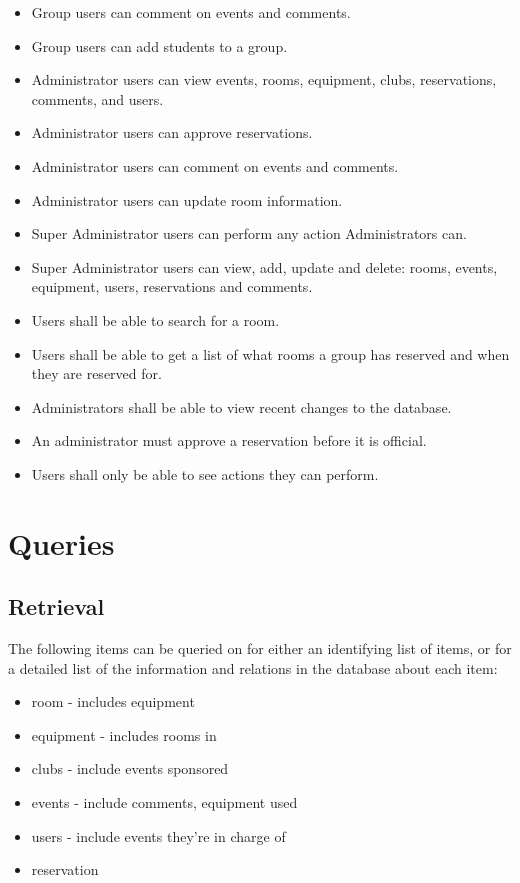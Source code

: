 \documentclass{article}
\begin{document}
\begin{itemize}
\item Group users can comment on events and comments.
\item Group users can add students to a group.
\item Administrator users can view events, rooms, equipment, clubs, reservations, comments, and users.
\item Administrator users can approve reservations.
\item Administrator users can comment on events and comments.
\item Administrator users can update room information.
\item Super Administrator users can perform any action Administrators can.
\item Super Administrator users can view, add, update and delete: rooms, events, equipment, users, reservations and comments.
\item Users shall be able to search for a room.
\item Users shall be able to get a list of what rooms a group has
reserved and when they are reserved for.
\item Administrators shall be able to view recent changes to the database.
\item An administrator must approve a reservation before it is official.
\item Users shall only be able to see actions they can perform.
\end{itemize}

\section{Queries}
\subsection{Retrieval}

The following items can be queried on for either an identifying list of items,
or for a detailed list of the information and relations in the database about each item:
\begin{itemize}
\item room - includes equipment
\item equipment - includes rooms in
\item clubs - include events sponsored 
\item events - include comments, equipment used
\item users - include events they're in charge of
\item reservation 
\end{itemize}
\end{document}
